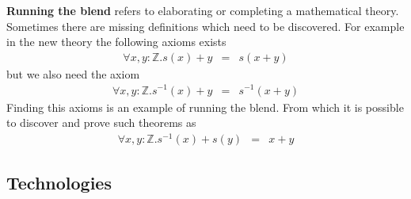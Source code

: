 {\bf Running the blend} refers to elaborating or completing a
mathematical theory. Sometimes there are missing definitions which
need to be discovered. For example in the new theory the following
axioms exists
\begin{eqnarray*}
\forall x,y:\mathbb{Z}. s(x) + y &=& s(x+y)
\end{eqnarray*}
but we also need the axiom
\begin{eqnarray*}
\forall x,y:\mathbb{Z}. s^{-1}(x) + y &=& s^{-1}(x+y)
\end{eqnarray*}
Finding this axioms is an example of running the blend. From which it
is possible to discover and prove such theorems as
\begin{eqnarray*}
\forall x,y:\mathbb{Z}. s^{-1}(x) + s(y) &=& x+y
\end{eqnarray*}

\subsection{Technologies}






